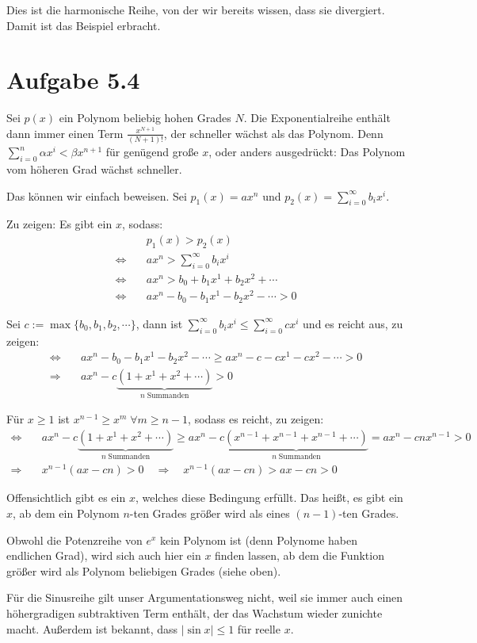 \documentclass[a4paper,german,12pt,smallheadings]{scrartcl}
\begin{document}
Dies ist die harmonische Reihe, von der wir bereits wissen, dass sie divergiert. Damit ist das Beispiel erbracht.

\section*{Aufgabe 5.4}

Sei $p(x)$ ein Polynom beliebig hohen Grades $N$. Die Exponentialreihe enthält
dann immer einen Term $\frac{x^{N+1}}{(N+1)!}$, der schneller wächst als das
Polynom. Denn $\sum_{i=0}^n \alpha x^i < \beta x^{n+1}$ für genügend große $x$,
oder anders ausgedrückt: Das Polynom vom höheren Grad wächst schneller.

Das können wir einfach beweisen. Sei $p_1(x)=ax^n$ und $p_2(x)=\sum\limits_{i=0}^{\infty} b_i x^i$.

Zu zeigen: Es gibt ein $x$, sodass:
\begin{align*}
  &p_1(x)>p_2(x)\\
  \Leftrightarrow\quad& ax^n>\sum\limits_{i=0}^{\infty} b_i x^i\\
  \Leftrightarrow\quad& ax^n>b_0+b_1x^1+b_2x^2+ \cdots\\
  \Leftrightarrow\quad& ax^n-b_0-b_1x^1-b_2x^2- \cdots >0
\end{align*}

Sei $c:=\max\{b_0,b_1,b_2,\cdots\}$, dann ist $\sum\limits_{i=0}^{\infty} b_i x^i \leq \sum\limits_{i=0}^{\infty} c x^i$ und es reicht aus, zu zeigen:
\begin{align*}
  \Leftrightarrow\quad& ax^n-b_0-b_1x^1-b_2x^2- \cdots \geq ax^n-c-cx^1-cx^2- \cdots>0\\
  \Rightarrow\quad& ax^n-c\underbrace{\left(1+x^1+x^2+\cdots \right)}_{n\;\text{Summanden}}>0
\end{align*}

Für $x \geq 1$ ist $x^{n-1} \geq x^m \; \forall m \geq n-1$, sodass es reicht, zu zeigen:
\begin{align*}
  \Leftrightarrow\quad & ax^n-c\underbrace{\left(1+x^1+x^2+\cdots \right)}_{n\;\text{Summanden}} \geq ax^n-c\underbrace{\left(x^{n-1}+x^{n-1}+x^{n-1}+\cdots \right)}_{n\;\text{Summanden}} = ax^n-cnx^{n-1} > 0\\
  \Rightarrow\quad& x^{n-1}\left(ax-cn\right)>0 \quad \Rightarrow \quad x^{n-1}\left(ax-cn\right)>ax-cn>0
\end{align*}

Offensichtlich gibt es ein $x$, welches diese Bedingung erfüllt. Das heißt, es
gibt ein $x$, ab dem ein Polynom $n$-ten Grades größer wird als eines $(n-1)$-ten
Grades.

Obwohl die Potenzreihe von $e^x$ kein Polynom ist (denn Polynome haben
endlichen Grad), wird sich auch hier ein $x$ finden lassen, ab dem die Funktion
größer wird als Polynom beliebigen Grades (siehe oben).

Für die Sinusreihe gilt unser Argumentationsweg nicht, weil sie immer auch einen
höhergradigen subtraktiven Term enthält, der das Wachstum wieder zunichte macht.
Außerdem ist bekannt, dass $|\sin x| \le 1$ für reelle $x$.
\end{document}
